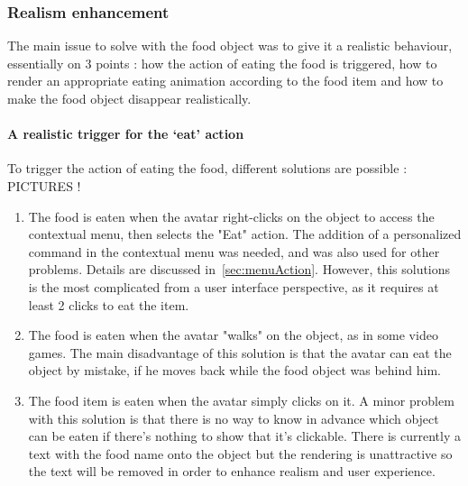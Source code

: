 

	\subsubsection{Realism enhancement}
The main issue to solve with the food object was to give it a realistic behaviour, essentially on 3 points : how the action of eating the food is triggered, how to render an appropriate eating animation according to the food item and how to make the food object disappear realistically.
\\
	\paragraph{A realistic trigger for the `eat' action}
\label{sec:food}

To trigger the action of eating the food, different solutions are possible : \\
PICTURES !

\begin{enumerate}
\item The food is eaten when the avatar right-clicks on the object to access the contextual menu, then selects the "Eat" action. The addition of a personalized command in the contextual menu was needed, and was also used for other problems. Details are discussed in~\ref{sec:menuAction}. However, this solutions is the most complicated from a user interface perspective, as it requires at least 2 clicks to eat the item.
\item The food is eaten when the avatar "walks" on the object, as in some video games. The main disadvantage of this solution is that the avatar can eat the object by mistake, if he moves back while the food object was behind him.
\item The food item is eaten when the avatar simply clicks on it. A minor problem with this solution is that there is no way to know in advance which object can be eaten if there's nothing to show that it's clickable. There is currently a text with the food name onto the object but the rendering is unattractive so the text will be removed in order to enhance realism and user experience.
\end{enumerate}


